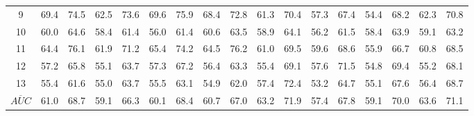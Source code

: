 \documentclass[runningheads,a4paper]{llncs}
\begin{document}
\begin{table*}[!htbp]
\begin{tabular}{|c|c|g|c|g|c|g|c|g|c|g|c|g|c|g|c|g|}
9 & 69.4 & 74.5 & 62.5 & 73.6 & 69.6 & 75.9 & 68.4 & 72.8 & 61.3 & 70.4 & 57.3 & 67.4 & 54.4 & 68.2 & 62.3 & 70.8 \\
10 & 60.0 & 64.6 & 58.4 & 61.4 & 56.0 & 61.4 & 60.6 & 63.5 & 58.9 & 64.1 & 56.2 & 61.5 & 58.4 & 63.9 & 59.1 & 63.2 \\
11 & 64.4 & 76.1 & 61.9 & 71.2 & 65.4 & 74.2 & 64.5 & 76.2 & 61.0 & 69.5 & 59.6 & 68.6 & 55.9 & 66.7 & 60.8 & 68.5 \\
12 & 57.2 & 65.8 & 55.1 & 63.7 & 57.3 & 67.2 & 56.4 & 63.3 & 55.4 & 69.1 & 57.6 & 71.5 & 54.8 & 69.4 & 55.2 & 68.1 \\
13 & 55.4 & 61.6 & 55.0 & 63.7 & 55.5 & 63.1 & 54.9 & 62.0 & 57.4 & 72.4 & 53.2 & 64.7 & 55.1 & 67.6 & 56.4 & 68.7 \\
\hline
$\overline{AUC}$ & 61.0 & 68.7 & 59.1 & 66.3 & 60.1 & 68.4 & 60.7 & 67.0 & 63.2 & 71.9 & 57.4 & 67.8 & 59.1 & 70.0 & 63.6 & 71.1 \\
\hline
\end{tabular}
\end{table*}
\end{document}
